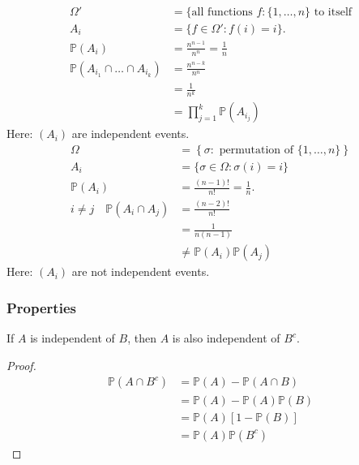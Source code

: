\begin{example}[Independence] ~\vspace*{-1.5\baselineskip} \label{exm:indep1}
    \begin{itemize}
        \mathitem
        \begin{align*}
            \Omega' &= \{\text{all functions } f : \{1, \dots, n\} \text{ to itself} \\
            A_i &= \{f \in \Omega' : f(i) = i\}. \\
            \mathbb{P}(A_i) &= \frac{n^{n -1}}{n^n} = \frac{1}{n} \\
            \mathbb{P}(A_{i_1} \cap \dots \cap A_{i_k}) &= \frac{n^{n -k}}{n^n} \\
            &= \frac{1}{n^k} \\
            &= \prod_{j = 1}^k \mathbb{P}(A_{i_j})
        \end{align*} 
        Here: $(A_i)$ are independent events.
        \mathitem
        \begin{align*}
            \Omega &= \left\{\sigma : \text{ permutation of } \{1, \dots, n\} \right\} \\
            A_i &= \{ \sigma \in \Omega : \sigma(i) = i \} \\
            \mathbb{P}(A_i) &= \frac{(n - 1)!}{n!} = \frac{1}{n}. \\
            i \neq j \quad \mathbb{P}(A_i \cap A_j) &= \frac{(n - 2)!}{n!} \\
            &= \frac{1}{n(n - 1)} \\
            &\neq \mathbb{P}(A_i) \mathbb{P}(A_j)
        \end{align*} 
        Here: $(A_i)$ are not independent events.
    \end{itemize} 
\end{example} 

\subsubsection{Properties}
\begin{claim}
    If $A$ is independent of $B$, then $A$ is also independent of $B^c$.
\end{claim} 

\begin{proof}
    \begin{align*}
        \mathbb{P}(A \cap B^c) &= \mathbb{P}(A) - \mathbb{P}(A \cap B) \\
        &= \mathbb{P}(A) - \mathbb{P}(A)\mathbb{P}(B) \\
        &= \mathbb{P}(A) [1 - \mathbb{P}(B)] \\
        &= \mathbb{P}(A) \mathbb{P}(B^c)
    \end{align*}  
\end{proof} 

